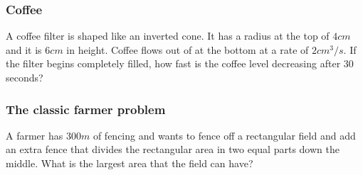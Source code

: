 \documentclass[14pt]{beamer}
\begin{document}
\begin{frame}[t]
\frametitle{Coffee}

A coffee filter is shaped like an inverted cone.  It has a radius at the top of $4cm$ and it is $6cm$ in height.   Coffee flows out of at the bottom at a rate of $2cm^3/s$.   If the filter begins completely filled, how fast is the coffee level decreasing after 30 seconds?

\end{frame}
\begin{frame}[t]
\frametitle{The classic farmer problem}

 A farmer has $300m$ of fencing and wants to fence off a rectangular field and add an extra fence that divides the rectangular area in two equal parts down the middle.  What is the largest area that the field can have?

\end{frame}
\end{document}
